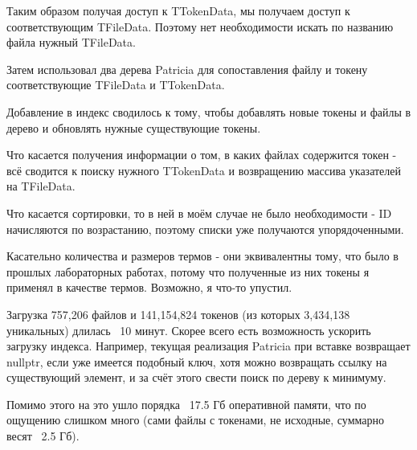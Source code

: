 Таким образом получая доступ к TTokenData, мы получаем доступ к соответствующим TFileData. Поэтому нет необходимости искать по названию файла нужный TFileData.

Затем использовал два дерева Patricia для сопоставления файлу и токену соответствующие TFileData и TTokenData.

Добавление в индекс сводилось к тому, чтобы добавлять новые токены и файлы в дерево и обновлять нужные существующие токены.

Что касается получения информации о том, в каких файлах содержится токен - всё сводится к поиску нужного TTokenData и возвращению массива указателей на TFileData.

Что касается сортировки, то в ней в моём случае не было необходимости - ID начисляются по возрастанию, поэтому списки уже получаются упорядоченными.

Касательно количества и размеров термов - они эквивалентны тому, что было в прошлых лабораторных работах, потому что полученные из них токены я применял в качестве термов. Возможно, я что-то упустил.

Загрузка 757,206 файлов и 141,154,824 токенов (из которых 3,434,138 уникальных) длилась ~10 минут. Скорее всего есть возможность ускорить загрузку индекса. Например, текущая реализация Patricia при вставке возвращает nullptr, если уже имеется подобный ключ, хотя можно возвращать ссылку на существующий элемент, и за счёт этого свести поиск по дереву к минимуму. 

Помимо этого на это ушло порядка ~17.5 Гб оперативной памяти, что по ощущению слишком много (сами файлы с токенами, не исходные, суммарно весят ~2.5 Гб).

\pagebreak

